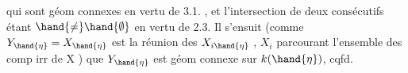 
qui sont géom connexes  en vertu de 3.1. , et  l'intersection
de deux consécutifs étant $\hand{\neq} \hand{\emptyset}$ en vertu de 2.3. Il s'ensuit (comme
$Y_{\hand{\eta}} = X_{\hand{\eta}}$ est la réunion des $X_{i\hand{\eta}}$ , $X_i$ parcourant l'ensemble des comp
irr de X ) que  $Y_{\hand{\eta}}$ est géom connexe sur $k(\hand{\eta})$, cqfd.

